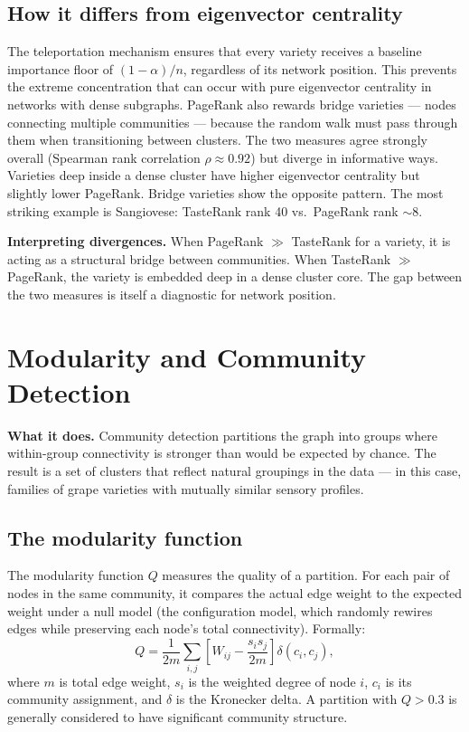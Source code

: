 \documentclass[11pt]{article}
\begin{document}
\subsection{How it differs from eigenvector centrality}
The teleportation mechanism ensures that every variety receives a baseline importance floor of $(1 - \alpha)/n$, regardless of its network position. This prevents the extreme concentration that can occur with pure eigenvector centrality in networks with dense subgraphs. PageRank also rewards bridge varieties --- nodes connecting multiple communities --- because the random walk must pass through them when transitioning between clusters. The two measures agree strongly overall (Spearman rank correlation $\rho \approx 0.92$) but diverge in informative ways. Varieties deep inside a dense cluster have higher eigenvector centrality but slightly lower PageRank. Bridge varieties show the opposite pattern. The most striking example is Sangiovese: TasteRank rank 40 vs.\ PageRank rank $\sim 8$.

\textbf{Interpreting divergences.} When PageRank $\gg$ TasteRank for a variety, it is acting as a structural bridge between communities. When TasteRank $\gg$ PageRank, the variety is embedded deep in a dense cluster core. The gap between the two measures is itself a diagnostic for network position.

\section{Modularity and Community Detection}

\textbf{What it does.} Community detection partitions the graph into groups where within-group connectivity is stronger than would be expected by chance. The result is a set of clusters that reflect natural groupings in the data --- in this case, families of grape varieties with mutually similar sensory profiles.

\subsection{The modularity function}
The modularity function $Q$ measures the quality of a partition. For each pair of nodes in the same community, it compares the actual edge weight to the expected weight under a null model (the configuration model, which randomly rewires edges while preserving each node's total connectivity). Formally:
\[
Q = \frac{1}{2m} \sum_{i,j} \left[ W_{ij} - \frac{s_i s_j}{2m} \right] \delta(c_i, c_j),
\]
where $m$ is total edge weight, $s_i$ is the weighted degree of node $i$, $c_i$ is its community assignment, and $\delta$ is the Kronecker delta. A partition with $Q > 0.3$ is generally considered to have significant community structure.
\end{document}
